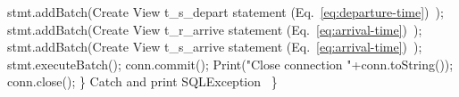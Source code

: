 \documentclass{article}
\def\nwendcode{\endtrivlist \endgroup}      %
\let\nwdocspar=\par
\theoremstyle{definition}                   %
\begin{document}
    stmt.addBatch(\LA{}Create View t\_s\_depart statement (Eq.~\ref{eq:departure-time})~{\nwtagstyle{}}\RA{});
    stmt.addBatch(\LA{}Create View t\_r\_arrive statement (Eq.~\ref{eq:arrival-time})~{\nwtagstyle{}}\RA{});
    stmt.addBatch(\LA{}Create View t\_s\_arrive statement (Eq.~\ref{eq:arrival-time})~{\nwtagstyle{}}\RA{});
    stmt.executeBatch();
    conn.commit();
    Print("Close connection "+conn.toString());
    conn.close();
  \}
  \LA{}Catch and print \code{}SQLException\edoc{}~{\nwtagstyle{}}\RA{}
\}
\eatline
{}\nwendcode{}\nwdocspar
\end{document}
